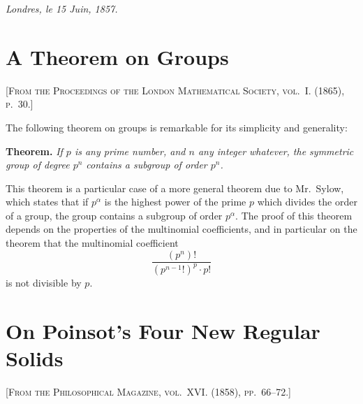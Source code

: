 \documentclass[11pt,a4paper]{article}
\begin{document}
\medskip
\noindent\textit{Londres, le 15 Juin, 1857.}

\newpage


\section{A Theorem on Groups}

\textsc{[From the Proceedings of the London Mathematical Society, vol.~I. (1865), p.~30.]}
\label{paper:240}

\setcounter{page}{80}

The following theorem on groups is remarkable for its simplicity and generality:

\medskip
\noindent\textbf{Theorem.} \textit{If $p$ is any prime number, and $n$ any integer whatever, the symmetric group of degree $p^n$ contains a subgroup of order $p^n$.}

\medskip
This theorem is a particular case of a more general theorem due to Mr.~Sylow, which states that if $p^\alpha$ is the highest power of the prime $p$ which divides the order of a group, the group contains a subgroup of order $p^\alpha$. The proof of this theorem depends on the properties of the multinomial coefficients, and in particular on the theorem that the multinomial coefficient
\[
\frac{(p^n)!}{(p^{n-1}!)^p \cdot p!}
\]
is not divisible by $p$.

\newpage


\section{On Poinsot's Four New Regular Solids}

\textsc{[From the Philosophical Magazine, vol.~XVI. (1858), pp.~66--72.]}
\label{paper:241}

\setcounter{page}{81}
\end{document}
